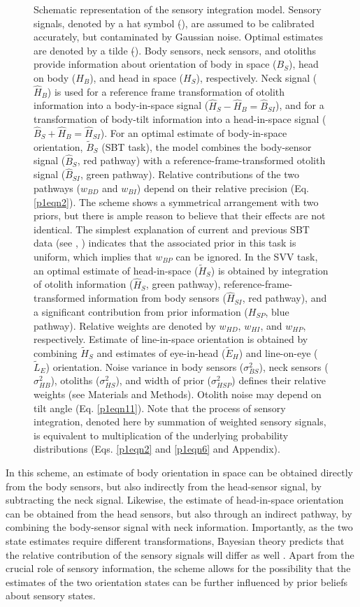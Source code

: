 \begin{figure}
    \caption{Schematic representation of the sensory integration model. Sensory signals, denoted by a hat symbol ($\hat{ }$), are assumed to be calibrated accurately, but contaminated by Gaussian noise. Optimal estimates are denoted by a tilde ($\tilde{ }$). Body sensors, neck sensors, and otoliths provide information about orientation of body in space ($B_S$), head on body ($H_B$), and head in space ($H_S$), respectively. Neck signal ($\hat{H}_B$) is used for a reference frame transformation of otolith information into a body-in-space signal ($\hat{H}_S - \hat{H}_B = \hat{B}_{SI}$), and for a transformation of body-tilt information into a head-in-space signal ($\hat{B}_S + \hat{H}_B = \hat{H}_{SI}$). For an optimal estimate of body-in-space orientation, $\tilde{B}_S$ (SBT task), the model combines the body-sensor signal ($\hat{B}_S$, red pathway) with a reference-frame-transformed otolith signal ($\hat{B}_{SI}$, green pathway). Relative contributions of the two pathways ($w_{BD}$ and $w_{BI}$) depend on their relative precision (Eq. \ref{p1eqn2}). The scheme shows a symmetrical arrangement with two priors, but there is ample reason to believe that their effects are not identical. The simplest explanation of current and previous SBT data (see , ) indicates that the associated prior in this task is uniform, which implies that $w_{BP}$ can be ignored. In the SVV task, an optimal estimate of head-in-space ($\tilde{H}_S$) is obtained by integration of otolith information ($\hat{H}_S$, green pathway), reference-frame-transformed information from body sensors ($\hat{H}_{SI}$, red pathway), and a significant contribution from prior information ($H_{SP}$, blue pathway). Relative weights are denoted by $w_{HD}$, $w_{HI}$, and $w_{HP}$, respectively. Estimate of line-in-space orientation is obtained by combining $\tilde{H}_S$ and estimates of eye-in-head ($\tilde{E}_H$) and line-on-eye ($\tilde{L}_E$) orientation. Noise variance in body sensors ($\sigma^2_{BS}$), neck sensors ($\sigma^2_{HB}$), otoliths ($\sigma^2_{HS}$), and width of prior ($\sigma^2_{HSP}$) defines their relative weights (see Materials and Methods). Otolith noise may depend on tilt angle (Eq. \ref{p1eqn11}). Note that the process of sensory integration, denoted here by summation of weighted sensory signals, is equivalent to multiplication of the underlying probability distributions (Eqs. \ref{p1eqn2} and \ref{p1eqn6} and Appendix).}
\end{figure}

In this scheme, an estimate of body orientation in space can be obtained directly from the body sensors, but also indirectly from the head-sensor signal, by subtracting the neck signal. Likewise, the estimate of head-in-space orientation can be obtained from the head sensors, but also through an indirect pathway, by combining the body-sensor signal with neck information. Importantly, as the two state estimates require different transformations, Bayesian theory predicts that the relative contribution of the sensory signals will differ as well \cite{mcguire2009}. Apart from the crucial role of sensory information, the scheme allows for the possibility that the estimates of the two orientation states can be further influenced by prior beliefs about sensory states. 

